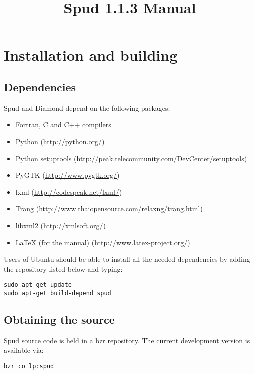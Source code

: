 \documentclass[a4paper, 11pt]{book}
\title{Spud 1.1.3 Manual}
\begin{document}
\maketitle

\tableofcontents


\chapter{Installation and building}

\section{Dependencies}

Spud and Diamond depend on the following packages:

\begin{itemize}
\item Fortran, C and C++ compilers
\item Python (\url{http://python.org/})
\item Python setuptools (\url{http://peak.telecommunity.com/DevCenter/setuptools})
\item PyGTK (\url{http://www.pygtk.org/})
\item lxml (\url{http://codespeak.net/lxml/})
\item Trang (\url{http://www.thaiopensource.com/relaxng/trang.html})
\item libxml2 (\url{http://xmlsoft.org/})
\item LaTeX (for the manual) (\url{http://www.latex-project.org/})
\end{itemize}

Users of Ubuntu should
be able to install all the needed dependencies by adding the repository listed below and typing:

\begin{verbatim}
sudo apt-get update
sudo apt-get build-depend spud
\end{verbatim}

\section{Obtaining the source}

Spud source code is held in a bzr repository. The current development version is available via:

\begin{verbatim}
bzr co lp:spud
\end{verbatim}
\end{document}
